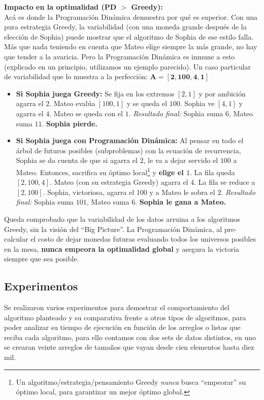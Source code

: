 \textbf{Impacto en la optimalidad (PD $>$ Greedy): }
\\
Acá es donde la Programación Dinámica demuestra por qué es superior. Con una pura estrategia Greedy, la variabilidad (con una moneda grande después de la elección de Sophia) puede mostrar que el algoritmo de Sophia de ese estilo falla. Más que nada teniendo en cuenta que Mateo elige siempre la más grande, no hay que tender a la avaricia. Pero la Programación Dinámica es inmune a esto (explicado en un principio, utilizamos un ejemplo parecido).
Un caso particular de variabilidad que lo muestra a la perfección: 
$\mathbf{A = [2, 100, 4, 1]}$
\begin{itemize}
    \item \textbf{Si Sophia juega Greedy:} Se fija en los extremos $[2, 1]$ y por ambición agarra el $2$. Mateo evalúa $[100, 1]$ y se queda el $100$. Sophia ve $[4, 1]$ y agarra el $4$. Mateo se queda con el $1$. \textit{Resultado final:} Sophia suma $6$, Mateo suma $11$. \textbf{Sophia pierde.}
    \item \textbf{Si Sophia juega con Programación Dinámica:} Al pensar en todo el árbol de futuros posibles (subproblemas) con la ecuación de recurrencia, Sophia se da cuenta de que si agarra el $2$, le va a dejar servido el $100$ a Mateo. Entonces, sacrifica su óptimo local\footnote{Un algoritmo/estrategia/pensamiento Greedy \textit{nunca} busca ``empeorar'' su óptimo local, para garantizar un mejor óptimo global.} y \textbf{elige el $1$}. La fila queda $[2, 100, 4]$. Mateo (con su estrategia Greedy) agarra el $4$. La fila se reduce a $[2, 100]$. Sophia, victoriosa, agarra el $100$ y a Mateo le sobra el $2$. \textit{Resultado final:} Sophia suma $101$, Mateo suma $6$. \textbf{Sophia le gana a Mateo.}
\end{itemize}

Queda comprobado que la variabilidad de los datos arruina a los algoritmos Greedy, sin la visión del ``Big Picture''. La Programación Dinámica, al pre-calcular el costo de dejar monedas futuras evaluando todos los universos posibles en la mesa, \textbf{nunca empeora la optimalidad global} y asegura la victoria siempre que sea posible.

\subsection{Experimentos}

Se realizaron varios experimentos para demostrar el comportamiento del algoritmo planteado y su comparativa frente a otros tipos de algoritmos, para poder analizar su tiempo de ejecución en función de los arreglos o listas que reciba cada algoritmo, para ello contamos con dos sets de datos distintos, en uno se crearan veinte arreglos de tamaños que vayan desde cien elementos hasta diez mil.

